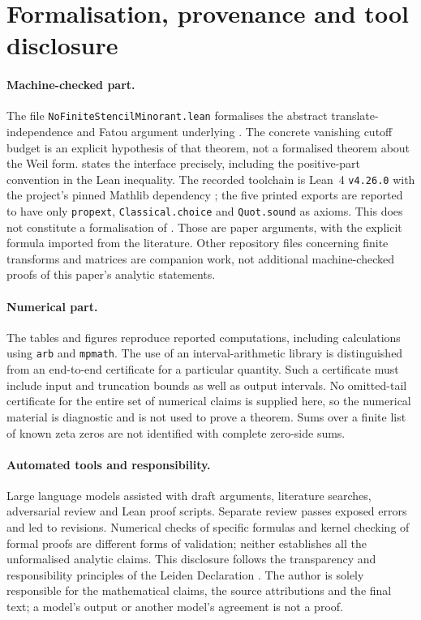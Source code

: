 \section{Formalisation, provenance and tool disclosure}\label{sec:disclosure}

\paragraph{Machine-checked part.}
The file \texttt{NoFiniteStencilMinorant.lean} formalises the abstract
translate-independence and Fatou argument underlying
. The concrete vanishing cutoff budget is an
explicit hypothesis of that theorem, not a formalised theorem about
the Weil form.  states the interface precisely,
including the positive-part convention in the Lean inequality.
The recorded toolchain is Lean~4 \texttt{v4.26.0} with the project's
pinned Mathlib dependency \cite{Mathlib}; the five printed exports
are reported to have only \texttt{propext},
\texttt{Classical.choice} and \texttt{Quot.sound} as axioms.
This does not constitute a formalisation of
.
Those are paper arguments, with the explicit formula imported from
the literature. Other repository files concerning finite transforms
and matrices are companion work, not additional machine-checked
proofs of this paper's analytic statements.

\paragraph{Numerical part.}
The tables and figures reproduce reported computations, including
calculations using \texttt{arb} and \texttt{mpmath}. The use of an
interval-arithmetic library is distinguished from an end-to-end
certificate for a particular quantity. Such a certificate must
include input and truncation bounds as well as output intervals.
No omitted-tail certificate for the entire set of numerical claims
is supplied here, so the numerical material is diagnostic and is not
used to prove a theorem. Sums over a finite list of known zeta zeros
are not identified with complete zero-side sums.

\paragraph{Automated tools and responsibility.}
Large language models assisted with draft arguments, literature
searches, adversarial review and Lean proof scripts. Separate review
passes exposed errors and led to revisions. Numerical checks of
specific formulas and kernel checking of formal proofs are different
forms of validation; neither establishes all the unformalised
analytic claims. This disclosure follows the transparency and
responsibility principles of the Leiden Declaration
\cite{LeidenDeclaration2026}. The author is solely responsible for
the mathematical claims, the source attributions and the final text;
a model's output or another model's agreement is not a proof.


